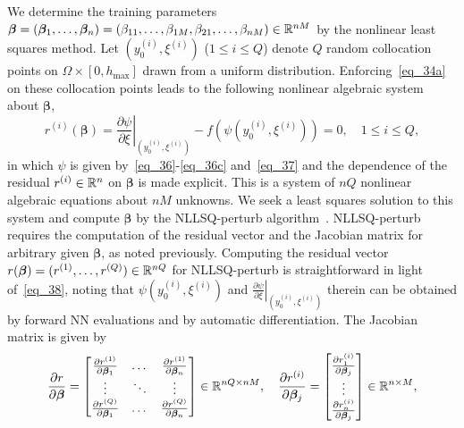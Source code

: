 We determine the training parameters
$
\bm\beta = (\bm\beta_1,\dots,\bm\beta_n)
=(\beta_{11},\dots,\beta_{1M},\beta_{21},\dots,\beta_{nM})
\in\mathbb{R}^{nM}
$
by the nonlinear least squares method.
Let $(y_0^{(i)},\xi^{(i)})$ ($1\leqslant i\leqslant Q$)
denote $Q$ random collocation points on
$\Omega\times[0,h_{\max}]$ drawn from
a uniform distribution. 
Enforcing~\eqref{eq_34a} on these collocation points
leads to the following nonlinear algebraic system about $\bm\beta$,
\begin{equation}\label{eq_38}
  r^{(i)}(\bm\beta) =
  \left.\frac{\partial\psi}{\partial\xi}\right|_{(y_0^{(i)},\xi^{(i)})}
  - f(\psi(y_0^{(i)},\xi^{(i)})) = 0,
  \quad 1\leqslant i\leqslant Q,
\end{equation}
in which $\psi$ is given by~\eqref{eq_36}-\eqref{eq_36c} and~\eqref{eq_37}
and the dependence of the residual $r^{(i)}\in\mathbb{R}^n$ on $\bm\beta$
is made explicit.
This is a system of $nQ$ nonlinear algebraic equations
about $nM$ unknowns. We seek a least squares
solution to this system and compute $\bm\beta$
by the NLLSQ-perturb algorithm~\cite{DongL2021,DongW2023}.
%
NLLSQ-perturb requires the computation of the residual vector
and the Jacobian matrix for arbitrary given $\bm\beta$,
as noted previously.
Computing the residual vector
$r(\bm\beta) = (r^{(1)},\dots,r^{(Q)})\in\mathbb{R}^{nQ}$
for NLLSQ-perturb is straightforward in light of~\eqref{eq_38},
noting that $\psi(y_0^{(i)},\xi^{(i)})$ and
$\left.\frac{\partial\psi}{\partial\xi}\right|_{(y_0^{(i)},\xi^{(i)})}$
therein can be obtained by forward NN evaluations
and by automatic differentiation.
%
The Jacobian matrix is given by
\begin{equation}
  \frac{\partial r}{\partial\bm\beta} = \begin{bmatrix}
    \frac{\partial r^{(1)}}{\partial\bm\beta_1} & \dots & \frac{\partial r^{(1)}}{\partial\bm\beta_n} \\
    \vdots & \ddots & \vdots \\
    \frac{\partial r^{(Q)}}{\partial\bm\beta_1} & \dots & \frac{\partial r^{(Q)}}{\partial\bm\beta_n}
  \end{bmatrix} \in\mathbb{R}^{nQ\times nM},
  \quad
  \frac{\partial r^{(i)}}{\partial\bm\beta_j} =
  \begin{bmatrix}
    \frac{\partial r_1^{(i)}}{\partial\bm\beta_j} \\
    \vdots \\ \frac{\partial r_n^{(i)}}{\partial\bm\beta_j}
  \end{bmatrix} \in\mathbb{R}^{n\times M},
\end{equation}
